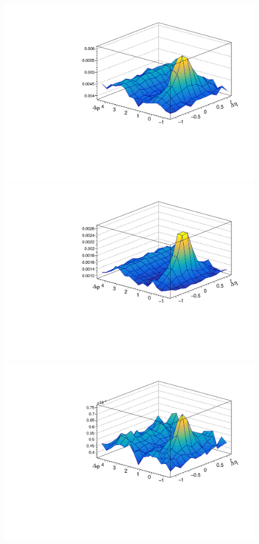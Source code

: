 \begin{figure}[ht]
	\centering
	\begin{minipage}{0.48\textwidth}
		\includegraphics[width=\textwidth]{figures/analysis/h_lambda_sig_dist_lowpt.pdf}
	\end{minipage}
	\begin{minipage}{0.48\textwidth}
		\includegraphics[width=\textwidth]{figures/analysis/h_lambda_sig_dist_highpt.pdf}
	\end{minipage}
	\begin{minipage}{0.48\textwidth}
		\includegraphics[width=\textwidth]{figures/analysis/h_lambda_rsb_dist_lowpt.pdf}

\end{minipage}
\end{figure}
